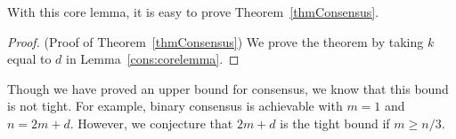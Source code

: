 With this core lemma, it is easy to prove Theorem~\ref{thmConsensus}.
\begin{proof}{(Proof of Theorem~\ref{thmConsensus})}
We prove the theorem by taking $k$ equal to $d$ in Lemma~\ref{cons:corelemma}.
\end{proof}
\fi

\begin{remark}
Though we have proved an upper bound for consensus, we know that this bound is not tight. 
For example, binary consensus is achievable with $m=1$ and $n=2m+d$. 
However, we conjecture that $2m+d$ is the tight bound if $m \geqslant n/3$.
\end{remark}
